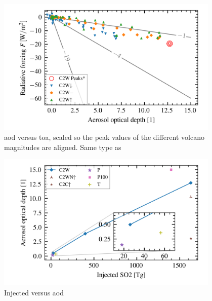 \documentclass{ametsocV5}
\begin{document}
\begin{figure}
  \begin{center}
    \includegraphics[width=0.95\textwidth]{figures/aod_vs_toa_avg_scaled.png}
  \end{center}
  \caption{
    \acrshort{aod} versus \acrshort{toa}, scaled so the peak values of the different
    volcano magnitudes are aligned. Same type as \cite{gregory2016}
  }
  \label{fig:aod_vs_toa_scaled}
\end{figure}

\begin{figure}
  \begin{center}
    \includegraphics[width=0.95\textwidth]{figures/injection_vs_aod.png}
  \end{center}
  \caption{Injected  versus \acrshort{aod}}
  \label{fig:so2_vs_aod}
\end{figure}
\end{document}
